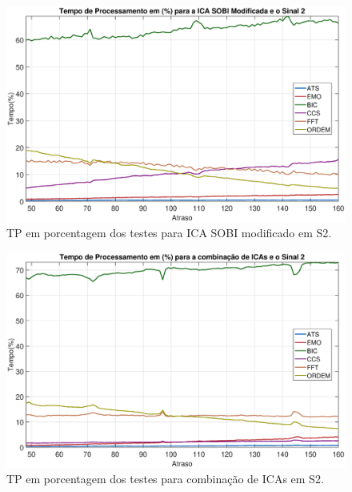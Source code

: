 \documentclass[a4paper,12pt]{monografia}
\theoremstyle{plain}
\theoremstyle{definition}
\theoremstyle{remark}
\begin{document}
\begin{figure}[!htb]
    \begin{center}
    \advance\leftskip -1.5cm
    \includegraphics[scale=0.45]{imagens/ImagensParaOAnexo/TPPAICASOBImodSinal2.eps}
    \caption{TP em porcentagem dos testes para ICA SOBI modificado em S2.}
    \label{fig:TPSMAS2}    
    \end{center}
\end{figure}

\begin{figure}[!htb]
    \begin{center}
    \advance\leftskip -1.5cm
    \includegraphics[scale=0.45]{imagens/ImagensParaOAnexo/TPPACombinacaoICASinal2.eps}
    \caption{TP em porcentagem dos testes para combinação de ICAs em S2.}
    \label{fig:TPCIAS2}    
    \end{center}
\end{figure}
\end{document}
